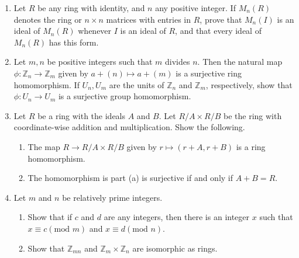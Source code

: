 \documentclass{article}
\theoremstyle{definition}
\newcommand{\m}[1]{(\text{mod }{#1})}
\newcommand{\Z}{\mathbb{Z}}
\begin{document}
\begin{enumerate}
\begin{proof}
                Now suppose that $1-xy$ is a unit for all $y\in R$ and $x\notin J(R)$. Then there exists a maximal ideal $M$ such that $x\notin M$. Thus $\langle x \rangle +M=R$. So there exists a $y\in R$ and $m\in M$ such that $xy+m=1$. Thus $m=1-xy\in M$ is a unit. So we must have $M=R$, but this is a contradiction to the maximality of $M$.
            \end{proof}

            \item Let $R$ be any ring with identity, and $n$ any positive integer. If $M_n(R)$ denotes the ring or $n\times n$ matrices with entries in $R$, prove that $M_n(I)$ is an ideal of $M_n(R)$ whenever $I$ is an ideal of $R$, and that every ideal of $M_n(R)$ has this form.
            
            \item Let $m,n$ be positive integers such that $m$ divides $n$. Then the natural map $\phi:\mathbb{Z}_n \to \mathbb{Z}_m$ given by $a+(n) \mapsto a+(m)$ is a surjective ring homomorphism. If $U_n,U_m$ are the units of $\mathbb{Z}_n$ and $\mathbb{Z}_m$, respectively, show that $\phi:U_n\to U_m$ is a surjective group homomorphism.
            
            \item Let $R$ be a ring with the ideals $A$ and $B$. Let $R/A\times R/B$ be the ring with coordinate-wise addition and multiplication. Show the following.
            
            \begin{enumerate}
                \item The map $R\to R/A\times R/B$ given by $r\mapsto (r+A,r+B)$ is a ring homomorphism. 
                \item The homomorphism is part (a) is surjective if and only if $A+B=R$.
            \end{enumerate}

            \item Let $m$ and $n$ be relatively prime integers. 
            
            \begin{enumerate}
                \item Show that if $c$ and $d$ are any integers, then there is an integer $x$ such that $x\equiv c \m{m}$ and $x\equiv d \m{n}$.
                \item Show that $\Z_{mn}$ and $\Z_m \times \Z_n$ are isomorphic as rings.
            \end{enumerate}


\end{enumerate}
\end{document}
